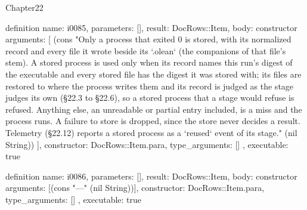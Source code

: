 \begin{lexlean}{Chapter22}
\begin{semanticmodule}
definition{
  name: i0085,
  parameters: [],
  result: DocRows::Item,
  body: constructor{
    arguments: [
      (cons "Only a process that exited 0 is stored, with its normalized record and every file it wrote beside its `.olean` (the companions of that file's stem). A stored process is used only when its record names this run's digest of the executable and every stored file has the digest it was stored with; its files are restored to where the process writes them and its record is judged as the stage judges its own (§22.3 to §22.6), so a stored process that a stage would refuse is refused. Anything else, an unreadable or partial entry included, is a miss and the process runs. A failure to store is dropped, since the store never decides a result. Telemetry (§22.12) reports a stored process as a `reused` event of its stage." (nil String))
    ],
    constructor: DocRows::Item.para,
    type_arguments: []
  },
  executable: true
}

definition{
  name: i0086,
  parameters: [],
  result: DocRows::Item,
  body: constructor{
    arguments: [(cons "---" (nil String))],
    constructor: DocRows::Item.para,
    type_arguments: []
  },
  executable: true
}
\end{semanticmodule}
\end{lexlean}
